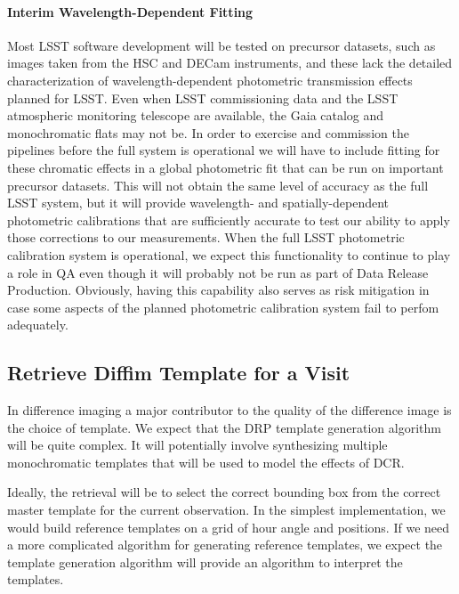 \paragraph{Interim Wavelength-Dependent Fitting}
\label{sec:acInterimPhotometricFit}

Most LSST software development will be tested on precursor datasets, such as images taken from the HSC and DECam instruments, and these lack the detailed characterization of wavelength-dependent photometric transmission effects planned for LSST.  Even when LSST commissioning data and the LSST atmospheric monitoring telescope are available, the Gaia catalog and monochromatic flats may not be.  In order to exercise and commission the pipelines before the full system is operational we will have to include fitting for these chromatic effects in a global photometric fit that can be run on important precursor datasets.  This will not obtain the same level of accuracy as the full LSST system, but it will provide wavelength- and spatially-dependent photometric calibrations that are sufficiently accurate to test our ability to apply those corrections to our measurements.  When the full LSST photometric calibration system is operational, we expect this functionality to continue to play a role in QA even though it will probably not be run as part of Data Release Production.  Obviously, having this capability also serves as risk mitigation in case some aspects of the planned photometric calibration system fail to perfom adequately.

\subsection{Retrieve Diffim Template for a Visit}
\label{sec:acRetrieveTemplate}
In difference imaging a major contributor to the quality of the difference image is the choice of template.  We expect that the DRP template generation algorithm will be quite complex.  It will potentially involve synthesizing multiple monochromatic templates that will be used to model the effects of DCR.

Ideally, the retrieval will be to select the correct bounding box from the correct master template for the current observation.  In the simplest implementation, we would build reference templates on a grid of hour angle and positions.  If we need a more complicated algorithm for generating reference templates, we expect the template generation algorithm will provide an algorithm to interpret the templates.

